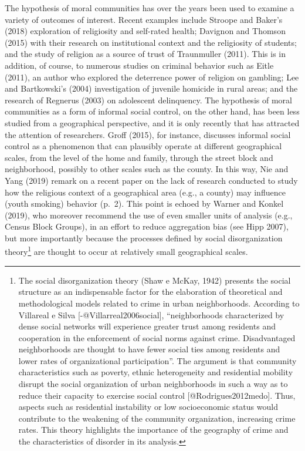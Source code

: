 \documentclass[smallextended]{svjour3}       %
\begin{document}
The hypothesis of moral communities has over the years been used to
examine a variety of outcomes of interest. Recent examples include
Stroope and Baker's (2018) exploration of religiosity and self-rated
health; Davignon and Thomson (2015) with their research on institutional
context and the religiosity of students; and the study of religion as a
source of trust of Traunmuller (2011). This is in addition, of course,
to numerous studies on criminal behavior such as Eitle (2011), an author
who explored the deterrence power of religion on gambling; Lee and
Bartkowski's (2004) investigation of juvenile homicide in rural areas;
and the research of Regnerus (2003) on adolescent delinquency. The
hypothesis of moral communities as a form of informal social control, on
the other hand, has been less studied from a geographical perspective,
and it is only recently that has attracted the attention of researchers.
Groff (2015), for instance, discusses informal social control as a
phenomenon that can plausibly operate at different geographical scales,
from the level of the home and family, through the street block and
neighborhood, possibly to other scales such as the county. In this way,
Nie and Yang (2019) remark on a recent paper on the lack of research
conducted to study how the religious context of a geographical area
(e.g., a county) may influence (youth smoking) behavior (p.~2). This
point is echoed by Warner and Konkel (2019), who moreover recommend the
use of even smaller units of analysis (e.g., Census Block Groups), in an
effort to reduce aggregation bias (see Hipp 2007), but more importantly
because the processes defined by social disorganization
theory\footnote{The social disorganization theory (Shaw e McKay, 1942)  presents the social structure as an indispensable factor for the elaboration of theoretical and methodological models related to crime in urban neighborhoods. According to Villareal e Silva [-@Villarreal2006social], “neighborhoods characterized by dense social networks will experience greater trust among residents and cooperation in the enforcement of social norms against crime. Disadvantaged neighborhoods are thought to have fewer social ties among residents and lower rates of organizational participation”. The argument is that community characteristics such as poverty, ethnic heterogeneity and residential mobility disrupt the social organization of urban neighborhoods in such a way as to reduce their capacity to exercise social control [@Rodrigues2012medo]. Thus, aspects such as residential instability or low socioeconomic status would contribute to the weakening of the community organization, increasing crime rates. This theory highlights the importance of the geography of crime and the characteristics of disorder in its analysis.}
are thought to occur at relatively small geographical scales.
\end{document}
